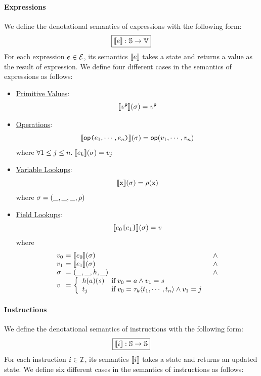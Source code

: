\paragraph{Expressions} We define the denotational semantics of expressions with
the following form:
\[
  \framebox{$\sem{\expr}: \stset \rightarrow \valset$}
\]
For each expression $e \in \mathcal{E}$, its semantics $\llbracket{e}\rrbracket$ takes a
state and returns a value as the result of expression. We define four different
cases in the semantics of expressions as
follows:
\begin{itemize}
  \item \underline{Primitive Values}:
    \[
      \llbracket{v^{\textsf{p}}}\rrbracket(\sigma) = v^{\textsf{p}}
    \]

  \item \underline{Operations}:
    \[
      \llbracket{\textsf{op}\texttt{(}e_1, \cdots, e_n \texttt{)}}\rrbracket(\sigma) =
      \textsf{op}(v_1, \cdots, v_n)
    \]
    where $\forall 1 \leq j \leq n. \; \llbracket{e_k}\rrbracket(\sigma) = v_j$

  \item \underline{Variable Lookups}:
    \[
      \llbracket{\texttt{x}}\rrbracket(\sigma) = \rho(\texttt{x})
    \]
    where $\sigma = (\_, \_, \_, \rho)$

  \item \underline{Field Lookups}:
    \[
      \llbracket{e_0 \texttt{[}e_1 \texttt{]}}\rrbracket(\sigma) = v
    \]
    where
    \[
      \begin{array}{l@{~}c@{~}ll}
        \val_0 &=& \sem{\expr_0}(\st) &\wedge\\
        \val_1 &=& \sem{\expr_1}(\st) &\wedge\\
        \st &=& (\_, \_, \heap, \_) &\wedge\\
        \val &=& \left\{
          \begin{array}{ll}
            \heap(\addr)(\str)
            & \text{if} \; \val_0 = \addr \wedge \val_1 = \str\\

            \tree_j
            & \text{if} \; \val_0 = \ty_k \langle \tree_1, \cdots, \tree_n
            \rangle \wedge \val_1 = j\\
          \end{array}
        \right.\\
      \end{array}
    \]
\end{itemize}

\paragraph{Instructions} We define the denotational semantics of instructions
with the following form:
\[
  \framebox{$\sem{\inst}: \stset \rightarrow \stset$}
\]
For each instruction $i \in \mathcal{I}$, its semantics $\llbracket{i}\rrbracket$ takes a
state and returns an updated state. We define six different cases in the
semantics of instructions as follows:

